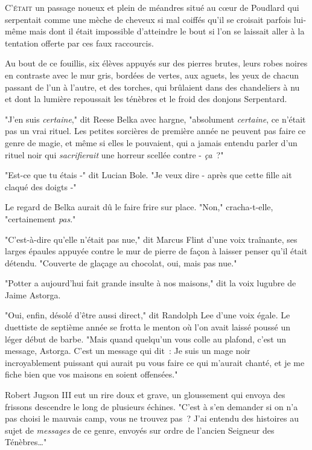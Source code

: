 
\lettrine{C}{'était} un passage noueux et plein de méandres situé au cœur de Poudlard qui serpentait comme une mèche de cheveux si mal coiffés qu'il se croisait parfois lui-même mais dont il était impossible d'atteindre le bout si l'on se laissait aller à la tentation offerte par ces faux raccourcis.

Au bout de ce fouillis, six élèves appuyés sur des pierres brutes, leurs robes noires en contraste avec le mur gris, bordées de vertes, aux aguets, les yeux de chacun passant de l'un à l'autre, et des torches, qui brûlaient dans des chandeliers à nu et dont la lumière repoussait les ténèbres et le froid des donjons Serpentard.

"J'en suis \emph{certaine}," dit Reese Belka avec hargne, "absolument \emph{certaine}, ce n'était pas un vrai rituel. Les petites sorcières de première année ne peuvent pas faire ce genre de magie, et même si elles le pouvaient, qui a jamais entendu parler d'un rituel noir qui \emph{sacrifierait} une horreur scellée contre - \emph{ça}~?"

"Est-ce que tu étais -" dit Lucian Bole. "Je veux dire - après que cette fille ait claqué des doigts -"

Le regard de Belka aurait dû le faire frire sur place. "Non," cracha-t-elle, "certainement \emph{pas}."

"C'est-à-dire qu'elle n'était pas nue," dit Marcus Flint d'une voix traînante, ses larges épaules appuyée contre le mur de pierre de façon à laisser penser qu'il était détendu. "Couverte de glaçage au chocolat, oui, mais pas nue."

"Potter a aujourd'hui fait grande insulte à nos maisons," dit la voix lugubre de Jaime Astorga.

"Oui, enfin, désolé d'être aussi direct," dit Randolph Lee d'une voix égale. Le duettiste de septième année se frotta le menton où l'on avait laissé poussé un léger début de barbe. "Mais quand quelqu'un vous colle au plafond, c'est un message, Astorga. C'est un message qui dit~: Je suis un mage noir incroyablement puissant qui aurait pu vous faire ce qui m'aurait chanté, et je me fiche bien que vos maisons en soient offensées."

Robert Jugson III eut un rire doux et grave, un gloussement qui envoya des frissons descendre le long de plusieurs échines. "C'est à s'en demander si on n'a pas choisi le mauvais camp, vous ne trouvez pas~? J'ai entendu des histoires au sujet de \emph{messages} de ce genre, envoyés sur ordre de l'ancien Seigneur des Ténèbres…"

